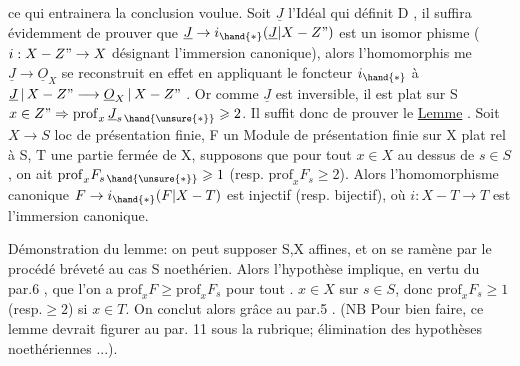 
ce qui entrainera la conclusion voulue. Soit $\underline{J}$ l'Idéal qui définit
D , il suffira évidemment de prouver que $\underline{J}\to i_{\hand{*}}(\underline{J}|X-Z")$ est un isomor
phisme ($i:X-Z"\to X$ désignant l'immersion canonique), alors l'homomorphis
me $\underline{J}\to\underline{O}_X$ se reconstruit en effet en appliquant le foncteur $i_{\hand{*}}$ à
$\underline{J}\,|\,X-Z" \longrightarrow \underline{O}_X\,|\,X-Z"$ . Or comme $\underline{J}$ est inversible, il est plat sur S 
 $x\in Z" \Rightarrow \mathrm{prof}_x\,\underline{J}_{s\,\hand{\unsure{*}}} \geqslant 2$. Il suffit donc de prouver le
\uline{Lemme} . Soit $X\to S$ loc de présentation finie, F un Module de présentation
finie sur X plat rel à S, T une partie fermée de X, supposons que pour
tout $x\in X$ au dessus de $s\in S$, on ait \hand{\unsure{/}} $\mathrm{prof}_x F_{s\,\hand{\unsure{*}}}\geqslant 1$ (resp. $\mathrm{prof}_x F_s \geqslant 2$).
Alors l'homomorphisme canonique $F\to i_{\hand{*}}(F|X-T)$ est injectif (resp.
bijectif), où $i:X-T\to T$ est l'immersion canonique.

Démonstration du lemme: on peut supposer S,X affines, et on se
ramène par le procédé bréveté au cas S noethérien. Alors l'hypothèse
implique, en vertu du par.6 , que l'on a $\mathrm{prof}_x F \geqslant \mathrm{prof}_x F_s$ pour tout .
$x\in X$ sur $s\in S$, donc $\mathrm{prof}_x F_s \geqslant 1$ (resp.$\geqslant 2$) si $x\in T$. On conclut alors
grâce au par.5 . (NB Pour bien faire, ce lemme devrait figurer au par.
11 sous la rubrique; élimination des hypothèses noethériennes ...).

